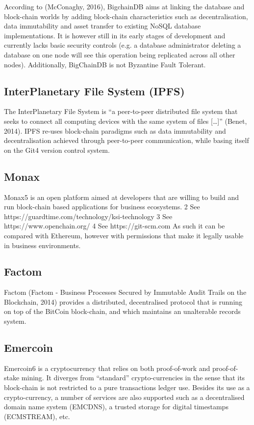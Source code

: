 \documentclass{tnreport}
\begin{document}
According to (McConaghy, 2016), BigchainDB aims at linking the database and block-chain worlds by adding block-chain characteristics such as decentralisation, data immutability and asset transfer to existing NoSQL database implementations.
It is however still in its early stages of development and currently lacks basic security controls (e.g. a database administrator deleting a database on one node will see this operation being replicated across all other nodes). Additionally, BigChainDB is not Byzantine Fault Tolerant.

\subsection{InterPlanetary File System (IPFS)}

The InterPlanetary File System is “a peer-to-peer distributed file system that seeks to connect all computing devices with the same system of files […]” (Benet, 2014).
IPFS re-uses block-chain paradigms such as data immutability and decentralisation achieved through peer-to-peer communication, while basing itself on the Git4 version control system.

\subsection{Monax}

Monax5 is an open platform aimed at developers that are willing to build and run block-chain based applications for business ecosystems.
2 See https://guardtime.com/technology/ksi-technology
3 See https://www.openchain.org/
4 See https://git-scm.com
As such it can be compared with Ethereum, however with permissions that make it legally usable in business environments.

\subsection{Factom}

Factom (Factom - Business Processes Secured by Immutable Audit Trails on the Blockchain, 2014) provides a distributed, decentralised protocol that is running on top of the BitCoin block-chain, and which maintains an unalterable records system.

\subsection{Emercoin}

Emercoin6 is a cryptocurrency that relies on both proof-of-work and proof-of-stake mining. It diverges from “standard” crypto-currencies in the sense that its block-chain is not restricted to a pure transactions ledger use. Besides its use as a crypto-currency, a number of services are also supported such as a decentralised domain name system (EMCDNS), a trusted storage for digital timestamps (ECMSTREAM), etc.
\end{document}

